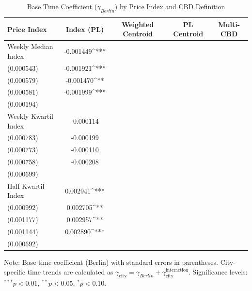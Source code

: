 \begin{table}[h!]
\centering
\caption{Base Time Coefficient ($\gamma_{Berlin}$) by Price Index and CBD Definition}
\label{tab:gammas_results}
\begin{tabular}{lcccc}
\toprule
Price Index & Index (PL) & Weighted Centroid & PL Centroid & Multi-CBD \\
\midrule
Weekly Median Index & -0.001449^{***}\\ (0.000543) & -0.001921^{***}\\ (0.000579) & -0.001470^{**}\\ (0.000581) & -0.001999^{***}\\ (0.000194) \\
Weekly Kwartil Index & -0.000114\\ (0.000783) & -0.000199\\ (0.000773) & -0.000110\\ (0.000758) & -0.000208\\ (0.000699) \\
Half-Kwartil Index & 0.002941^{***}\\ (0.000992) & 0.002705^{**}\\ (0.001177) & 0.002957^{**}\\ (0.001144) & 0.002890^{***}\\ (0.000692) \\
\bottomrule
\end{tabular}
\begin{tablenotes}[para]
\small
Note: Base time coefficient (Berlin) with standard errors in parentheses.
City-specific time trends are calculated as $\gamma_{\text{city}} = \gamma_{Berlin} + \gamma_{\text{city}}^{\text{interaction}}$.
Significance levels: $^{***} p<0.01$, $^{**} p<0.05$, $^{*} p<0.10$.
\end{tablenotes}
\end{table}
